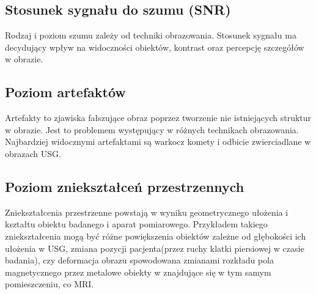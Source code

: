 \subsection{Stosunek sygnału do szumu (SNR)}

Rodzaj i poziom szumu zależy od techniki obrazowania.
Stosunek sygnału ma decydujący wpływ na widoczności obiektów, kontrast oraz percepcję szczegółów w obrazie.

\subsection{Poziom artefaktów}

Artefakty to zjawiska fałszujące obraz poprzez tworzenie nie istniejących struktur w obrazie.
Jest to problemem występujący w różnych technikach obrazowania.
Najbardziej widocznymi artefaktami są warkocz komety i odbicie zwierciadlane w obrazach USG.

\subsection{Poziom zniekształceń przestrzennych}

Zniekształcenia przestrzenne powstają w wyniku geometrycznego ułożenia i kształtu obiektu badanego i aparat pomiarowego.
Przykładem takiego zniekształcenia mogą być różne powiększenia obiektów zależne od głębokości ich ułożenia w USG, zmiana pozycji pacjenta(przez ruchy klatki piersiowej w czasie badania), czy deformacja obrazu spowodowana zmianami rozkładu pola magnetycznego przez metalowe obiekty w znajdujące się w tym samym pomieszczeniu, co MRI.

